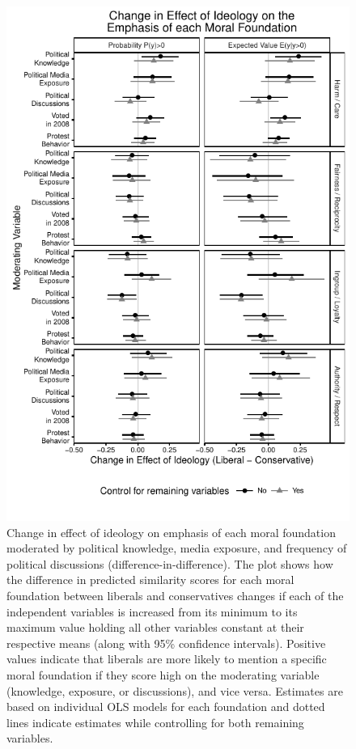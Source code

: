 \documentclass[12pt]{article}
\begin{document}
\begin{figure}[ht]\centering
\includegraphics{../calc/fig/tobit_learnideol.pdf}
\caption{Change in effect of ideology on emphasis of each moral foundation moderated by political knowledge, media exposure, and frequency of political discussions (difference-in-difference). The plot shows how the difference in predicted similarity scores for each moral foundation between liberals and conservatives changes if each of the independent variables is increased from its minimum to its maximum value holding all other variables constant at their respective means (along with 95\% confidence intervals). Positive values indicate that liberals are more likely to mention a specific moral foundation if they score high on the moderating variable (knowledge, exposure, or discussions), and vice versa. Estimates are based on individual OLS models for each foundation and dotted lines indicate estimates while controlling for both remaining variables. %
}\label{fig:tobit_learnideol}
\end{figure}
\end{document}

